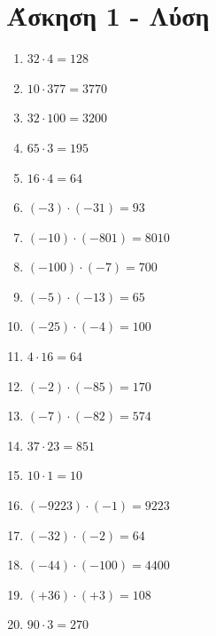 \documentclass[a4paper,10pt]{report}
\begin{document}
\section*{Άσκηση 1 - Λύση\hfill \small{}}
\begin{enumerate}[1)]
 \item $32\cdot 4=128$
 \item $10\cdot 377=3770$
 \item $32\cdot100=3200$
 \item $65\cdot3=195$
 \item $16\cdot4=64$
 \item $(-3)\cdot(-31)=93$
 \item $(-10)\cdot(-801)=8010$
 \item $(-100)\cdot(-7)=700$
 \item $(-5)\cdot(-13)=65$
 \item $(-25)\cdot(-4)=100$
 \item $4\cdot16=64$
 \item $(-2)\cdot(-85)=170$
 \item $(-7)\cdot(-82)=574$
 \item $37\cdot23=851$
 \item $10\cdot1=10$
 \item $(-9223)\cdot(-1)=9223$
 \item $(-32)\cdot(-2)=64$
 \item $(-44)\cdot(-100)=4400$
 \item $(+36)\cdot(+3)=108$
 \item $90\cdot3=270$
\end{enumerate}

\end{document}
